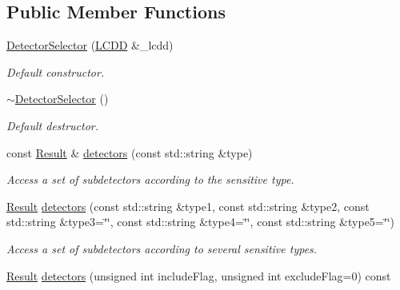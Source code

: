 \subsection*{Public Member Functions}
\begin{DoxyCompactItemize}
\item 
\hyperlink{class_d_d4hep_1_1_geometry_1_1_detector_selector_a683570559af13a80725cf14d8c3cd4b6}{DetectorSelector} (\hyperlink{class_d_d4hep_1_1_geometry_1_1_l_c_d_d}{LCDD} \&\_\-lcdd)
\begin{DoxyCompactList}\small\item\em Default constructor. \item\end{DoxyCompactList}\item 
\hyperlink{class_d_d4hep_1_1_geometry_1_1_detector_selector_a20dcfab3e2fb33672b347aa4fdcea393}{$\sim$DetectorSelector} ()
\begin{DoxyCompactList}\small\item\em Default destructor. \item\end{DoxyCompactList}\item 
const \hyperlink{class_d_d4hep_1_1_geometry_1_1_detector_selector_a6ce0dfe8c83f5d36138244218f260ed1}{Result} \& \hyperlink{class_d_d4hep_1_1_geometry_1_1_detector_selector_ad9407f2aa15753164488fe498e167d9f}{detectors} (const std::string \&type)
\begin{DoxyCompactList}\small\item\em Access a set of subdetectors according to the sensitive type. \item\end{DoxyCompactList}\item 
\hyperlink{class_d_d4hep_1_1_geometry_1_1_detector_selector_a6ce0dfe8c83f5d36138244218f260ed1}{Result} \hyperlink{class_d_d4hep_1_1_geometry_1_1_detector_selector_a2e5d96725e4b37a6cea8e7c704d91a87}{detectors} (const std::string \&type1, const std::string \&type2, const std::string \&type3=\char`\"{}\char`\"{}, const std::string \&type4=\char`\"{}\char`\"{}, const std::string \&type5=\char`\"{}\char`\"{})
\begin{DoxyCompactList}\small\item\em Access a set of subdetectors according to several sensitive types. \item\end{DoxyCompactList}\item 
\hyperlink{class_d_d4hep_1_1_geometry_1_1_detector_selector_a6ce0dfe8c83f5d36138244218f260ed1}{Result} \hyperlink{class_d_d4hep_1_1_geometry_1_1_detector_selector_ab87dfdbdee0e921660d7f54bbdc02a9f}{detectors} (unsigned int includeFlag, unsigned int excludeFlag=0) const 
\end{DoxyCompactItemize}
